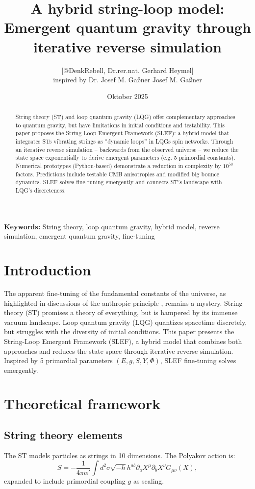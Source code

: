\documentclass[11pt,a4paper]{article}
\title{A hybrid string-loop model: Emergent quantum gravity through iterative reverse simulation}
\author{[@DenkRebell, Dr.rer.nat. Gerhard Heymel] \\ inspired by Dr. Josef M. Gaßner Josef M. Gaßner}
\date{Oktober 2025}
\begin{document}
	
	\maketitle
	
	\begin{abstract}
		String theory (ST) and loop quantum gravity (LQG) offer complementary approaches to quantum gravity, but have limitations in initial conditions and testability. 
		This paper proposes the String-Loop Emergent Framework (SLEF): a hybrid model that integrates STs vibrating strings as ``dynamic loops'' in LQGs spin networks. 
		Through an iterative reverse simulation -- backwards from the observed universe -- we reduce the state space exponentially to derive emergent parameters (e.g. 5 primordial constants). 
		Numerical prototypes (Python-based) demonstrate a reduction in complexity by $10^{50}$ factors. 
		Predictions include testable CMB anisotropies and modified big bounce dynamics. 
		SLEF solves fine-tuning emergently and connects ST's landscape with LQG's discreteness.
	\end{abstract}
	
	\textbf{Keywords:} String theory, loop quantum gravity, hybrid model, reverse simulation, emergent quantum gravity, fine-tuning
	
	\section{Introduction}
	The apparent fine-tuning of the fundamental constants of the universe, as highlighted in discussions of the anthropic principle \cite{gassner2024}, remains a mystery. 
	String theory (ST) promises a theory of everything, but is hampered by its immense vacuum landscape. 
	Loop quantum gravity (LQG) quantizes spacetime discretely, but struggles with the diversity of initial conditions. 
	This paper presents the String-Loop Emergent Framework (SLEF), a hybrid model that combines both approaches and reduces the state space through iterative reverse simulation. 
	Inspired by 5 primordial parameters $(E, g, S, Y, \Phi)$, SLEF fine-tuning solves emergently.
	
	\section{Theoretical framework}
	
	\subsection{String theory elements}
	The ST models particles as strings in 10 dimensions. The Polyakov action is:
	\begin{equation}
		S = -\frac{1}{4\pi\alpha'} \int d^2\sigma \sqrt{-h} h^{ab} \partial_a X^\mu \partial_b X^\nu G_{\mu\nu}(X),
	\end{equation}
	expanded to include primordial coupling $g$ as scaling.
	
\end{document}
